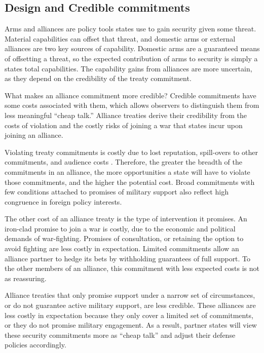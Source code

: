 \documentclass[12pt]{article}
\begin{document}
\subsection*{Design and Credible commitments}

Arms and alliances are policy tools states use to gain security given some threat. Material capabilities can offset that threat, and domestic arms or external alliances are two key sources of capability. Domestic arms are a guaranteed means of offsetting a threat, so the expected contribution of arms to security is simply a states total capabilities. The capability gains from alliances are more uncertain, as they depend on the credibility of the treaty commitment. 

What makes an alliance commitment more credible? Credible commitments have some costs associated with them, which allows observers to distinguish them from less meaningful ``cheap talk.'' Alliance treaties derive their credibility from the costs of violation and the costly risks of joining a war that states incur upon joining an alliance. 

Violating treaty commitments is costly due to lost reputation, spill-overs to other commitments, and audience costs \citep{Fearon1997, Tomz2007ar, Chibaetal2015, Levyetal2015}. Therefore, the greater the breadth of the commitments in an alliance, the more opportunities a state will have to violate those commitments, and the higher the potential cost. Broad commitments with few conditions attached to promises of military support also reflect high congruence in foreign policy interests. 

The other cost of an alliance treaty is the type of intervention it promises. An iron-clad promise to join a war is costly, due to the economic and political demands of war-fighting. Promises of consultation, or retaining the option to avoid fighting are less costly in expectation. Limited commitments allow an alliance partner to hedge its bets by withholding guarantees of full support. To the other members of an alliance, this commitment with less expected costs is not as reassuring. 

Alliance treaties that only promise support under a narrow set of circumstances, or do not guarantee active military support, are less credible. These alliances are less costly in expectation because they only cover a limited set of commitments, or they do not promise military engagement. As a result, partner states will view these security commitments more as ``cheap talk'' and adjust their defense policies accordingly. 
\end{document}
